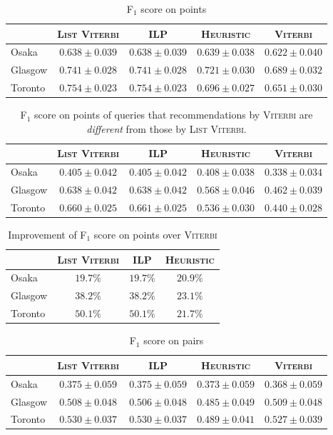 \begin{table*}[!t]
\label{tab:f1}
\caption{F$_1$ score on points}
\centering
\begin{tabular}{l|ccc|c} \hline
 & \textsc{List Viterbi} & \textsc{ILP} & \textsc{Heuristic} & \textsc{Viterbi} \\ \hline
Osaka & $0.638\pm0.039$ & $0.638\pm0.039$ & $0.639\pm0.038$ & $0.622\pm0.040$ \\
Glasgow & $0.741\pm0.028$ & $0.741\pm0.028$ & $0.721\pm0.030$ & $0.689\pm0.032$ \\
Toronto & $0.754\pm0.023$ & $0.754\pm0.023$ & $0.696\pm0.027$ & $0.651\pm0.030$ \\
\hline
\end{tabular}
\end{table*}

\begin{table*}[!t]
\label{tab:f1-diff}
\caption{F$_1$ score on points of queries that recommendations by \textsc{Viterbi} are \emph{different} from those by \textsc{List Viterbi}.}
\centering
\begin{tabular}{l|ccc|c} \hline
 & \textsc{List Viterbi} & \textsc{ILP} & \textsc{Heuristic} & \textsc{Viterbi} \\ \hline
Osaka & $0.405\pm0.042$ & $0.405\pm0.042$ & $0.408\pm0.038$ & $0.338\pm0.034$ \\
Glasgow & $0.638\pm0.042$ & $0.638\pm0.042$ & $0.568\pm0.046$ & $0.462\pm0.039$ \\
Toronto & $0.660\pm0.025$ & $0.661\pm0.025$ & $0.536\pm0.030$ & $0.440\pm0.028$ \\
\hline
\end{tabular}
\end{table*}

\begin{table*}[!t]
\caption{Improvement of F$_1$ score on points over \textsc{Viterbi}}
\label{tab:f1-up}
\centering
\begin{tabular}{l|ccc} \hline
 & \textsc{List Viterbi} & \textsc{ILP} & \textsc{Heuristic} \\ \hline
Osaka & $19.7\%$ & $19.7\%$ & $20.9\%$ \\
Glasgow & $38.2\%$ & $38.2\%$ & $23.1\%$ \\
Toronto & $50.1\%$ & $50.1\%$ & $21.7\%$ \\
\hline
\end{tabular}
\end{table*}


\begin{table*}[!t]
\label{tab:pf1}
\caption{F$_1$ score on pairs}
\centering
\begin{tabular}{l|ccc|c} \hline
 & \textsc{List Viterbi} & \textsc{ILP} & \textsc{Heuristic} & \textsc{Viterbi} \\ \hline
Osaka & $0.375\pm0.059$ & $0.375\pm0.059$ & $0.373\pm0.059$ & $0.368\pm0.059$ \\
Glasgow & $0.508\pm0.048$ & $0.506\pm0.048$ & $0.485\pm0.049$ & $0.509\pm0.048$ \\
Toronto & $0.530\pm0.037$ & $0.530\pm0.037$ & $0.489\pm0.041$ & $0.527\pm0.039$ \\
\hline
\end{tabular}
\end{table*}

